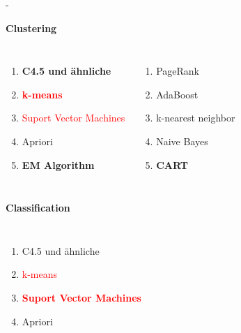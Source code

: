 \documentclass[fleqn,11pt,aspectratio=43]{beamer}
\begin{document}
\begin{frame}{\insertsectionhead - \insertsubsectionhead \cite{wu2008top}}
\small
\vspace{-0.6em}
\begin{block}{\vspace{-0.2em}\textbf{Clustering}\vspace{-0.2em}}
\vspace{-1.5em}
\begin{columns}[onlytextwidth]
		\begin{enumerate}[label=\bfseries\arabic*.]
		\setlength{\itemsep}{-5pt}
		\item \textbf{C4.5 und ähnliche}
		\item \textbf{\textcolor{red}{k-means}}
		\item \textcolor{red}{Suport Vector Machines}
		\item Apriori
		\item \textbf{EM Algorithm}
		\end{enumerate}
	    \begin{enumerate}[label=\bfseries\arabic*.]
	    \setlength{\itemsep}{-5pt}
	    \setcounter{enumi}{5}
	    \item PageRank
	    \item AdaBoost
	    \item k-nearest neighbor
	    \item Naive Bayes
	    \item \textbf{CART}
	    \end{enumerate}
\end{columns}
\vspace{-0.3em}
\end{block}
\pause
\vspace{-0.4em}
\begin{block}{\vspace{-0.2em}\textbf{Classification}\vspace{-0.2em}}
\vspace{-1.5em}
\begin{columns}[onlytextwidth]
		\begin{enumerate}[label=\bfseries\arabic*.]
		\setlength{\itemsep}{-5pt}
		\item C4.5 und ähnliche
		\item \textcolor{red}{k-means}
		\item \textbf{\textcolor{red}{Suport Vector Machines}}
		\item Apriori

\end{enumerate}
\end{columns}
\end{block}
\end{frame}
\end{document}
